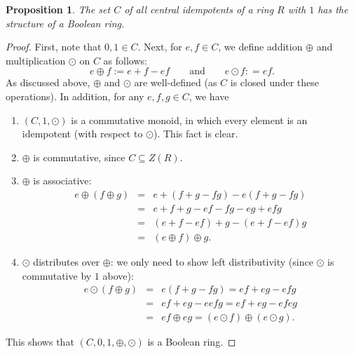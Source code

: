 \documentclass[12pt]{article}
\newtheorem{prop}{Proposition}
\begin{document}
\begin{prop} The set $C$ of all central idempotents of a ring $R$ with $1$ has the structure of a Boolean ring. \end{prop}
\begin{proof}  First, note that $0,1\in C$.  Next, for $e,f\in C$, we define addition $\oplus$ and multiplication $\odot$ on $C$ as follows:
$$ e \oplus f := e+f - ef \qquad \mbox{and} \qquad e\odot f: = ef.$$
As discussed above, $\oplus$ and $\odot$ are well-defined (as $C$ is closed under these operations).  In addition, for any $e,f,g\in C$, we have
\begin{enumerate}
\item $(C,1,\odot)$ is a commutative monoid, in which every element is an idempotent (with respect to $\odot$).  This fact is clear.
\item $\oplus$ is commutative, since $C \subseteq Z(R)$.
\item $\oplus$ is associative: 
\begin{eqnarray*}
e \oplus (f\oplus g) &=&  e + (f+g - fg) - e(f+g-fg) \\ &=& 
e + f + g - ef - fg - eg + efg \\ &=& (e+f-ef)+g -(e+f-ef)g  \\ &=& (e \oplus f)\oplus g.
\end{eqnarray*}
\item $\odot$ distributes over $\oplus$: we only need to show left distributivity (since $\odot$ is commutative by $1$ above): 
\begin{eqnarray*}
e \odot (f\oplus g) &=&  e(f+g-fg) = ef+eg-efg \\ &=& ef+eg-eefg = ef+eg-efeg \\ &=& ef \oplus eg = (e\odot f) \oplus (e\odot g).
\end{eqnarray*}
\end{enumerate}
This shows that $(C,0,1,\oplus,\odot)$ is a Boolean ring.
\end{proof}
\end{document}
